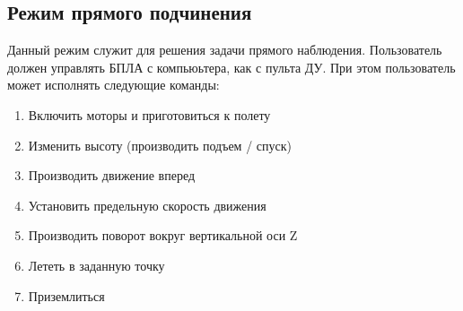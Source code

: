 \documentclass[utf8]{report}
\begin{document}
\subsection{Режим прямого подчинения}
Данный режим служит для решения задачи прямого наблюдения. Пользователь должен управлять БПЛА с компьюьтера, как с пульта ДУ. При этом пользователь может исполнять следующие команды:
\begin{enumerate}
  \item Включить моторы и приготовиться к полету
  \item Изменить высоту (производить подъем / спуск)
  \item Производить движение вперед
  \item Установить предельную скорость движения
  \item Производить поворот вокруг вертикальной оси Z
  \item Лететь в заданную точку
  \item Приземлиться
\end{enumerate}
\end{document}
